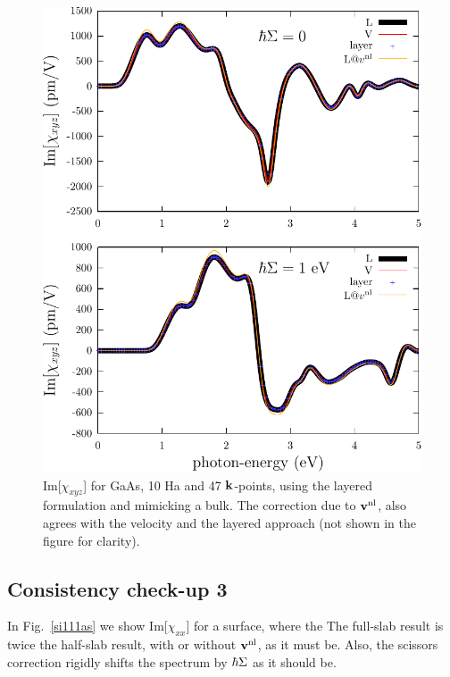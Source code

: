 \begin{figure}[b]
\centering
\includegraphics[scale=.7]{plots/shg-bulk}
\caption{Im[$\chi_{xyz}$] for GaAs, 10 Ha and 47 $\mathbf{k}$-points, using
  the layered formulation and mimicking a bulk. 
The correction
  due to $\mathbf{v}^{\mathrm{nl}}$, also agrees with the velocity and the layered
  approach (not shown in the figure for clarity).}
\label{gaas}
\end{figure}


\subsection{Consistency check-up 3}

In Fig.~\ref{si111as} we show
Im[$\chi_{xx}$] for a surface, where the 
The full-slab result is twice the half-slab
result, with or without $\mathbf{v}^{\mathrm{nl}}$,  as it must be. Also, the scissors
correction rigidly shifts the spectrum by $\hbar\Sigma$ as it should be.  

